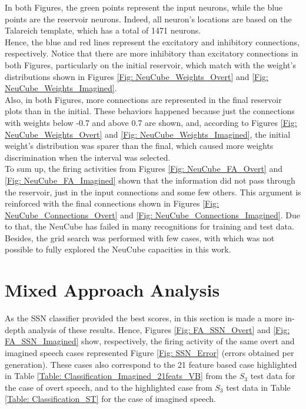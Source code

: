 In both Figures, the green points represent the input neurons, while the blue points are the reservoir neurons. Indeed, all neuron's locations are based on the Talareich template, which has a total of 1471 neurons.\\

Hence, the blue and red lines represent the excitatory and inhibitory connections, respectively. Notice that there are more inhibitory than excitatory connections in both Figures, particularly on the initial reservoir, which match with the weight's distributions shown in Figures \ref{Fig: NeuCube_Weights_Overt} and \ref{Fig: NeuCube_Weights_Imagined}.\\

Also, in both Figures, more connections are represented in the final reservoir plots than in the initial. These behaviors happened because just the connections with weights below -0.7 and above 0.7 are shown, and, according to Figures \ref{Fig: NeuCube_Weights_Overt} and \ref{Fig: NeuCube_Weights_Imagined}, the initial weight's distribution was sparer than the final, which caused more weights discrimination when the interval was selected.\\

To sum up, the firing activities from Figures \ref{Fig: NeuCube_FA_Overt} and \ref{Fig: NeuCube_FA_Imagined} shown that the information did not pass through the reservoir, just in the input connections and some few others. This argument is reinforced with the final connections shown in Figures \ref{Fig: NeuCube_Connections_Overt} and \ref{Fig: NeuCube_Connections_Imagined}. Due to that, the NeuCube has failed in many recognitions for training and test data. Besides, the grid search was performed with few cases, with which was not possible to fully explored the NeuCube capacities in this work.\\

\section{Mixed Approach Analysis}
As the SSN classifier provided the best scores, in this section is made a more in-depth analysis of these results. Hence, Figures \ref{Fig: FA_SSN_Overt} and \ref{Fig: FA_SSN_Imagined} show, respectively, the firing activity of the same overt and imagined speech cases represented Figure \ref{Fig: SSN_Error} (errors obtained per generation). These cases also correspond to the 21 feature based case highlighted in Table \ref{Table: Classification_Imagined_21feats_VB} from the $S_{3}$ test data for the case of overt speech, and to the highlighted case from $S_{3}$ test data in Table \ref{Table: Classification_ST} for the case of imagined speech.\\

